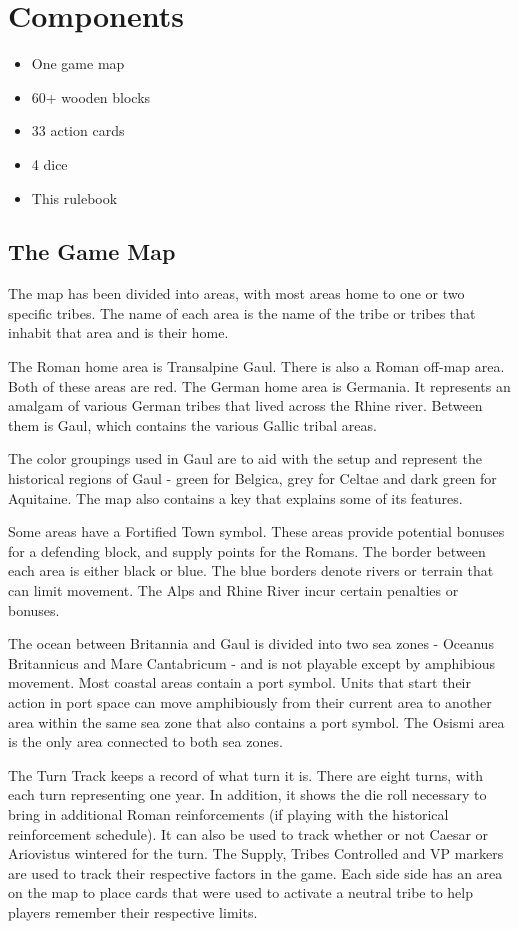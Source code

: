 \section{Components}

\begin{itemize}
  \setlength\itemsep{0em}
  \item One game map
  \item 60+ wooden blocks
  \item 33 action cards
  \item 4 dice
  \item This rulebook
\end{itemize}

\subsection{The Game Map}
The map has been divided into areas, with most areas home to one or two specific tribes. The name of each area is the name of the tribe or tribes that inhabit that area and is their home.

The Roman home area is Transalpine Gaul. There is also a Roman off-map area. Both of these areas are red. The German home area is Germania. It represents an amalgam of various German tribes that lived across the Rhine river. Between them is Gaul, which contains the various Gallic tribal areas.

The color groupings used in Gaul are to aid with the setup and represent the historical regions of Gaul - green for Belgica, grey for Celtae and dark green for Aquitaine. The map also contains a key that explains some of its features.

Some areas have a Fortified Town symbol. These areas provide potential bonuses for a defending block, and supply points for the Romans. The border between each area is either black or blue. The blue borders denote rivers or terrain that can limit movement. The Alps and Rhine River incur certain penalties or bonuses.

The ocean between Britannia and Gaul is divided into two sea zones - Oceanus Britannicus and Mare Cantabricum - and is not playable except by amphibious movement. Most coastal areas contain a port symbol. Units that start their action in port space can move amphibiously from their current area to another area within the same sea zone that also contains a port symbol. The Osismi area is the only area connected to both sea zones.

The Turn Track keeps a record of what turn it is. There are eight turns, with each turn representing one year. In addition, it shows the die roll necessary to bring in additional Roman reinforcements (if playing with the historical reinforcement schedule). It can also be used to track whether or not Caesar or Ariovistus wintered for the turn. The Supply, Tribes Controlled and VP markers are used to track their respective factors in the game. Each side side has an area on the map to place cards that were used to activate a neutral tribe to help players remember their respective limits.

